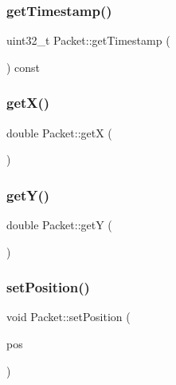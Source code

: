 \mbox{\label{class_packet_a2e14c61ea96af10b11d2c3f72e85f85f}} 
\subsubsection{\texorpdfstring{get\+Timestamp()}{getTimestamp()}}
{\footnotesize\ttfamily uint32\+\_\+t Packet\+::get\+Timestamp (\begin{DoxyParamCaption}{ }\end{DoxyParamCaption}) const}

\mbox{\label{class_packet_a5f5546101c133425bb797f2cf6ed23a9}} 
\subsubsection{\texorpdfstring{get\+X()}{getX()}}
{\footnotesize\ttfamily double Packet\+::getX (\begin{DoxyParamCaption}{ }\end{DoxyParamCaption})}

\mbox{\label{class_packet_a6aac4737a0da248a9d77680b62597b93}} 
\subsubsection{\texorpdfstring{get\+Y()}{getY()}}
{\footnotesize\ttfamily double Packet\+::getY (\begin{DoxyParamCaption}{ }\end{DoxyParamCaption})}

\mbox{\label{class_packet_aba2f74812c4345a0dd24235eb1c96028}} 
\subsubsection{\texorpdfstring{set\+Position()}{setPosition()}}
{\footnotesize\ttfamily void Packet\+::set\+Position (\begin{DoxyParamCaption}\item[{\hyperlink{class_position_data}{Position\+Data}}]{pos }\end{DoxyParamCaption})}



